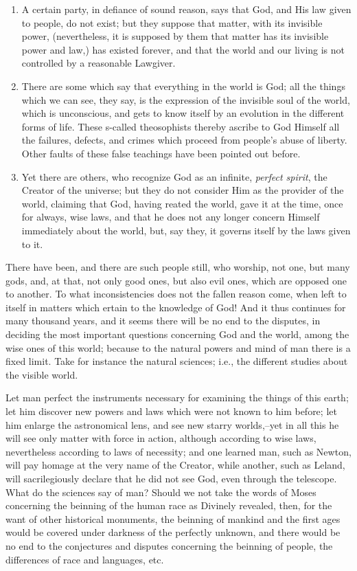 \begin{enumerate}
    \item A certain party, in defiance of sound reason, says that God, and His law given to people, do not exist; but they suppose that matter, with its invisible power, (nevertheless, it is supposed by them that matter has its invisible power and law,) has existed forever, and that the world and our living is not controlled by a reasonable Lawgiver.
    \item There are some which say that everything in the world is God; all the things which we can see, they say, is the expression of the invisible soul of the world, which is unconscious, and gets to know itself by an evolution in the different forms of life. These s-called theosophists thereby ascribe to God Himself all the failures, defects, and crimes which proceed from people's abuse of liberty. Other faults of these false teachings have been pointed out before.
    \item Yet there are others, who recognize God as an infinite, \textit{perfect spirit}, the Creator of the universe; but they do not consider Him as the provider of the world, claiming that God, having reated the world, gave it at the time, once for always, wise laws, and that he does not any longer concern Himself immediately about the world, but, say they, it governs itself by the laws given to it.
\end{enumerate}

There have been, and there are such people still, who worship, not one, but many gods, and, at that, not only good ones, but also evil ones, which are opposed one to another. To what inconsistencies does not the fallen reason come, when left to itself in matters which ertain to the knowledge of God! And it thus continues for many thousand years, and it seems there will be no end to the disputes, in deciding the most important questions concerning God and the world, among the wise ones of this world; because to the natural powers and mind of man there is a fixed limit. Take for instance the natural sciences; i.e., the different studies about the visible world.

Let man perfect the instruments necessary for examining the things of this earth; let him discover new powers and laws which were not known to him before; let him enlarge the astronomical lens, and see new starry worlds,--yet in all this he will see only matter with force in action, although according to wise laws, nevertheless according to laws of necessity; and one learned man, such as Newton, will pay homage at the very name of the Creator, while another, such as Leland, will sacrilegiously declare that he did not see God, even through the telescope. What do the sciences say of man? Should we not take the words of Moses concerning the beinning of the human race as Divinely revealed, then, for the want of other historical monuments, the beinning of mankind and the first ages would be covered under darkness of the perfectly unknown, and there would be no end to the conjectures and disputes concerning the beinning of people, the differences of race and languages, etc.


